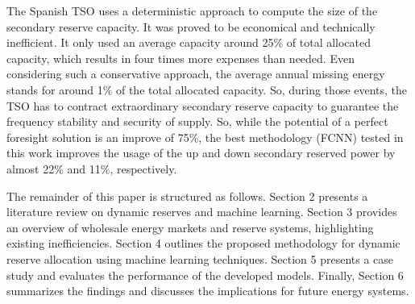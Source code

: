 \textcolor[rgb]{0,0.5,0}{The Spanish TSO uses a deterministic approach to compute the size of the secondary reserve capacity. It was proved to be economical and technically inefficient. It only used an average capacity around 25\% of total allocated capacity, which results in four times more expenses than needed. Even considering such a conservative approach, the average annual missing energy stands for around 1\% of the total allocated capacity\cite{Frade:19c,Algarvio2024,Algarvio:24,Martin:18}. So, during those events, the TSO has to contract extraordinary secondary reserve capacity to guarantee the frequency stability and security of supply. So, while the potential of a perfect foresight solution is an improve of 75\%, the best methodology (\gls{FCNN}) tested in this work improves the usage of the up and down secondary reserved power by almost 22\% and 11\%, respectively}. 
\par

The remainder of this paper is structured as follows. Section 2 presents a literature review on dynamic reserves and machine learning. Section 3 provides an overview of wholesale energy markets and reserve systems, highlighting existing inefficiencies. Section 4 outlines the proposed methodology for dynamic reserve allocation using machine learning techniques. Section 5 presents a case study and evaluates the performance of the developed models. Finally, Section 6 summarizes the findings and discusses the implications for future energy systems.\par

